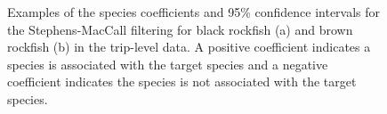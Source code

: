 \documentclass[
  12pt,
  authoryear,
  preprint,
  3p]{elsarticle}
\begin{document}
\begin{figure}

\begin{minipage}[t]{0.50\linewidth}

{\centering 


}

\end{minipage}%
%
\begin{minipage}[t]{0.50\linewidth}

{\centering 


}

\end{minipage}%

\caption{\label{fig-sm}Examples of the species coefficients and 95\%
confidence intervals for the Stephens-MacCall filtering for black
rockfish (a) and brown rockfish (b) in the trip-level data. A positive
coefficient indicates a species is associated with the target species
and a negative coefficient indicates the species is not associated with
the target species.}

\end{figure}
\end{document}
